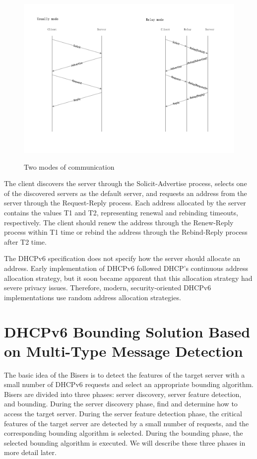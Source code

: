 \documentclass[conference]{IEEEtran}
\begin{document}
\begin{figure}[htbp]
  \caption{Two modes of communication}
  \label{figRelay}
  \centering
  \includegraphics[scale=0.3]{relay.pdf} \\
\end{figure}

The client discovers the server through the Solicit-Advertise process,
selects one of the discovered servers as the default server, and
requests an address from the server through the Request-Reply
process. Each address allocated by the server contains the values T1
and T2, representing renewal and rebinding timeouts, respectively. The
client should renew the address through the Renew-Reply process within
T1 time or rebind the address through the Rebind-Reply process after
T2 time.

The DHCPv6 specification does not specify how the server should
allocate an address. Early implementation of DHCPv6 followed DHCP's
continuous address allocation strategy, but it soon became apparent
that this allocation strategy had severe privacy issues. Therefore,
modern, security-oriented DHCPv6 implementations use random address
allocation strategies.

\section{DHCPv6 Bounding Solution Based on Multi-Type Message Detection}

The basic idea of the Bisers is to detect the features of the target
server with a small number of DHCPv6 requests and select an
appropriate bounding algorithm. Bisers are divided into three phases:
server discovery, server feature detection, and bounding. During the
server discovery phase, find and determine how to access the target
server. During the server feature detection phase, the critical
features of the target server are detected by a small number of
requests, and the corresponding bounding algorithm is selected. During
the bounding phase, the selected bounding algorithm is executed. We
will describe these three phases in more detail later.
\end{document}
